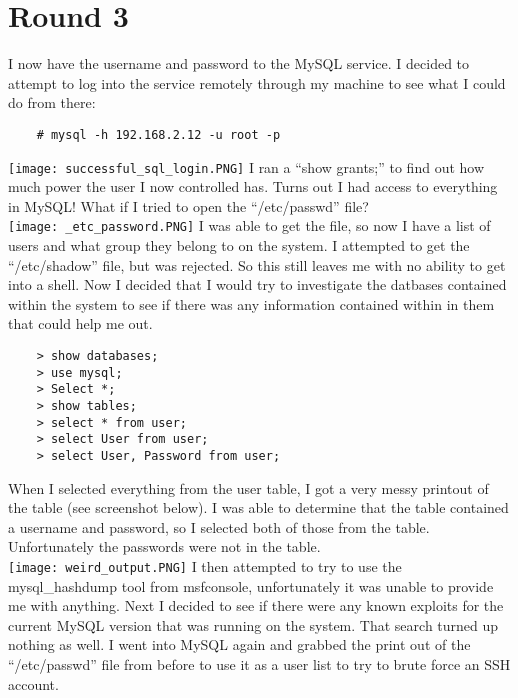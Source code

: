 \documentclass[12pt]{report}
\begin{document}
\section{Round 3}
I now have the username and password to the MySQL service. I decided to attempt to log into the service remotely through my machine to see what I could do from there:
	\begin{verbatim}
	# mysql -h 192.168.2.12 -u root -p
	\end{verbatim}
\texttt{[image: successful\_sql\_login.PNG]}
\newline
I ran a ``show grants;'' to find out how much power the user I now controlled has. Turns out I had access to everything in MySQL! What if I tried to open the ``/etc/passwd'' file?\\
\texttt{[image: \_etc\_password.PNG]}
\newline
I was able to get the file, so now I have a list of users and what group they belong to on the system. I attempted to get the ``/etc/shadow'' file, but was rejected. So this still leaves me with no ability to get into a shell. Now I decided that I would try to investigate the datbases contained within the system to see if there was any information contained within in them that could help me out.
	\begin{verbatim}
	> show databases;
	> use mysql; 
	> Select *;
	> show tables;
	> select * from user;
	> select User from user;
	> select User, Password from user;
	\end{verbatim}
When I selected everything from the user table, I got a very messy printout of the table (see screenshot below). I was able to determine that the table contained a username and password, so I selected both of those from the table. Unfortunately the passwords were not in the table.\\
\texttt{[image: weird\_output.PNG]}
\newline
I then attempted to try to use the mysql\_hashdump tool from msfconsole, unfortunately it was unable to provide me with anything. Next I decided to see if there were any known exploits for the current MySQL version that was running on the system. That search turned up nothing as well. I went into MySQL again and grabbed the print out of the ``/etc/passwd'' file from before to use it as a user list to try to brute force an SSH account.
\newline
\end{document}
